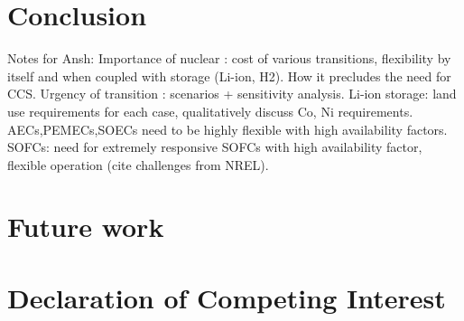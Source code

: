 \section{Conclusion} \label{Conclusion}
Notes for Ansh:
Importance of nuclear : cost of various transitions, flexibility by itself and when coupled with storage (Li-ion, H2). How it precludes the need for CCS.
Urgency of transition : scenarios + sensitivity analysis.
Li-ion storage: land use requirements for each case, qualitatively discuss Co, Ni requirements.
AECs,PEMECs,SOECs need to be highly flexible with high availability factors.
SOFCs: need for extremely responsive SOFCs with high availability factor, flexible operation (cite challenges from NREL).
\section{Future work}

\section{Declaration of Competing Interest}
